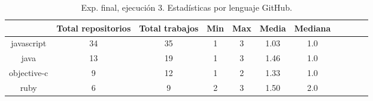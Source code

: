 \begin{table}[h]
  \centering
  \caption{Exp. final, ejecución 3. Estadísticas por lenguaje GitHub.}
  \label{tab:tabla_f3_4}

\begin{footnotesize}
\renewcommand{\arraystretch}{1.5} %
\begin{tabular}{ccccccccccc}
  \hline
  {} &  Total repositorios &  Total trabajos &  Min &  Max &  Media &  Mediana \\
  \hline
  javascript   &         34 &          35 &    1 &    3 &   1.03 &      1.0 \\
  java         &         13 &          19 &    1 &    3 &   1.46 &      1.0 \\
  objective-c  &          9 &          12 &    1 &    2 &   1.33 &      1.0 \\
  ruby         &          6 &           9 &    2 &    3 &   1.50 &      2.0 \\
 \end{tabular}
\end{footnotesize}

\end{table}

